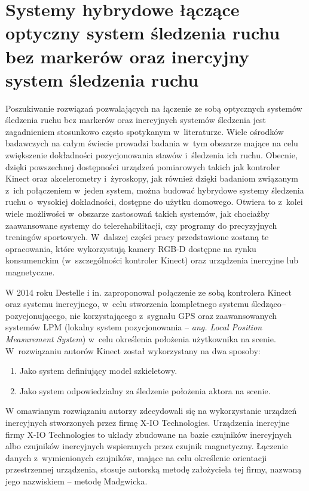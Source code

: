 \section{Systemy hybrydowe łączące optyczny system śledzenia ruchu bez markerów oraz inercyjny system śledzenia ruchu} \label{sec:literature:hybrids}
Poszukiwanie rozwiązań pozwalających na łączenie ze sobą optycznych systemów śledzenia ruchu bez markerów oraz inercyjnych systemów śledzenia jest zagadnieniem stosunkowo często spotykanym w~literaturze. Wiele ośrodków badawczych na całym świecie prowadzi badania w~tym obszarze mające na celu zwiększenie dokładności pozycjonowania stawów i~śledzenia ich ruchu. Obecnie, dzięki powszechnej dostępności urządzeń pomiarowych takich jak kontroler Kinect oraz akcelerometry i~żyroskopy, jak również dzięki badaniom związanym z~ich połączeniem w~jeden system, można budować hybrydowe systemy śledzenia ruchu o~wysokiej dokładności, dostępne do użytku domowego. Otwiera to z~kolei wiele możliwości w~obszarze zastosowań takich systemów, jak chociażby zaawansowane systemy do telerehabilitacji, czy programy do precyzyjnych treningów sportowych. W~dalszej części pracy przedstawione zostaną te opracowania, które wykorzystują kamery RGB-D dostępne na rynku konsumenckim (w~szczególności kontroler Kinect) oraz urządzenia inercyjne lub magnetyczne. 

W 2014 roku Destelle i in. \cite{Destelle2014} zaproponował połączenie ze sobą kontrolera Kinect oraz systemu inercyjnego, w~celu stworzenia kompletnego systemu śledząco--pozycjonującego, nie korzystającego z~sygnału GPS oraz zaawansowanych systemów LPM (lokalny system pozycjonowania -- \emph{ang. Local Position Measurement System}) w~celu określenia położenia użytkownika na scenie. W~rozwiązaniu autorów Kinect został wykorzystany na dwa sposoby:
\begin{enumerate}
	\item Jako system definiujący model szkieletowy.
	\item Jako system odpowiedzialny za śledzenie położenia aktora na scenie.
\end{enumerate}
									
W omawianym rozwiązaniu autorzy zdecydowali się na wykorzystanie urządzeń inercyjnych stworzonych przez firmę X-IO Technologies{}. Urządzenia inercyjne firmy X-IO Technologies to układy zbudowane na bazie czujników inercyjnych albo czujników inercyjnych wspieranych przez czujnik magnetyczny. Łączenie danych z~wymienionych czujników, mające na celu określenie orientacji przestrzennej urządzenia, stosuje autorską metodę założyciela tej firmy, nazwaną jego nazwiskiem -- metodę Madgwicka.

